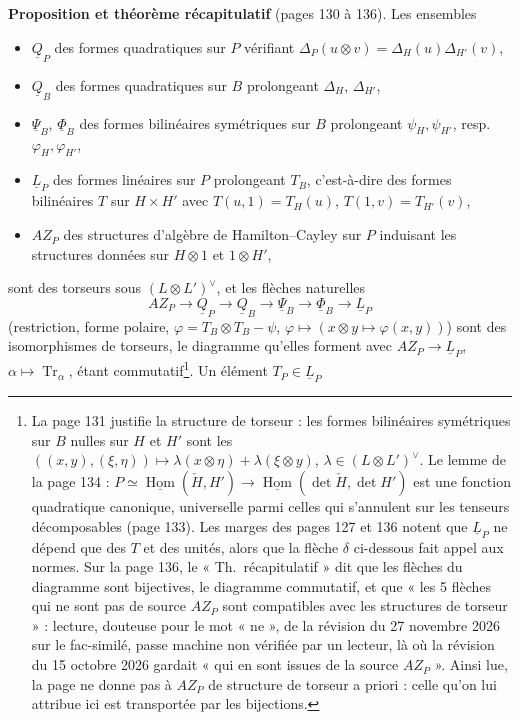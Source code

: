 \documentclass[11pt,a4paper]{article}
\begin{document}
\textbf{Proposition et théorème récapitulatif} (pages 130 à 136). Les ensembles
\begin{itemize}
  \item $\underline{Q}_P$ des formes quadratiques sur $P$ vérifiant
    $\Delta_P(u \otimes v) = \Delta_H(u)\Delta_{H'}(v)$,
  \item $\underline{Q}_B$ des formes quadratiques sur $B$ prolongeant
    $\Delta_H$, $\Delta_{H'}$,
  \item $\underline{\Psi}_B$, $\underline{\Phi}_B$ des formes bilinéaires
    symétriques sur $B$ prolongeant $\psi_H, \psi_{H'}$, resp. $\varphi_H,
    \varphi_{H'}$,
  \item $\underline{L}_P$ des formes linéaires sur $P$ prolongeant $T_B$,
    c'est-à-dire des formes bilinéaires $T$ sur $H \times H'$ avec $T(u, 1) =
    T_H(u)$, $T(1, v) = T_{H'}(v)$,
  \item $AZ_P$ des structures d'algèbre de Hamilton--Cayley sur $P$ induisant
    les structures données sur $H \otimes 1$ et $1 \otimes H'$,
\end{itemize}
sont des torseurs sous $(L \otimes L')^{\vee}$, et les flèches naturelles
\[
  AZ_P \to \underline{Q}_P \to \underline{Q}_B \to \underline{\Psi}_B \to
  \underline{\Phi}_B \to \underline{L}_P
\]
(restriction, forme polaire, $\varphi = T_B \otimes T_B - \psi$, $\varphi
\mapsto (x \otimes y \mapsto \varphi(x, y))$) sont des isomorphismes de
torseurs, le diagramme qu'elles forment avec $AZ_P \to \underline{L}_P$,
$\alpha \mapsto \operatorname{Tr}_\alpha$, étant commutatif\footnote{La page 131
justifie la structure de torseur : les formes bilinéaires symétriques sur $B$
nulles sur $H$ et $H'$ sont les $((x, y), (\xi, \eta)) \mapsto \lambda(x \otimes
\eta) + \lambda(\xi \otimes y)$, $\lambda \in (L \otimes L')^{\vee}$. Le lemme de la
page 134 : $P \simeq \underline{\operatorname{Hom}}(\check{H}, H') \to
\underline{\operatorname{Hom}}(\det\check{H}, \det H')$ est une fonction
quadratique canonique, universelle parmi celles qui s'annulent sur les tenseurs
décomposables (page 133). Les marges des pages 127 et 136 notent que
$\underline{L}_P$ ne dépend que des $T$ et des unités, alors que la flèche
$\delta$ ci-dessous fait appel aux normes. Sur la page 136, le « Th.\
récapitulatif » dit que les flèches du diagramme sont bijectives, le diagramme
commutatif, et que « les 5 flèches qui ne sont pas de source $AZ_P$ sont
compatibles avec les structures de torseur » : lecture, douteuse pour le mot
« ne », de la révision du 27 novembre 2026 sur le fac-similé, passe machine non
vérifiée par un lecteur, là où la révision du 15 octobre 2026 gardait « qui en
sont issues de la source $AZ_P$ ». Ainsi lue, la page ne donne pas à $AZ_P$ de
structure de torseur a priori : celle qu'on lui attribue ici est transportée
par les bijections.}. Un élément $T_P \in \underline{L}_P$
\end{document}

